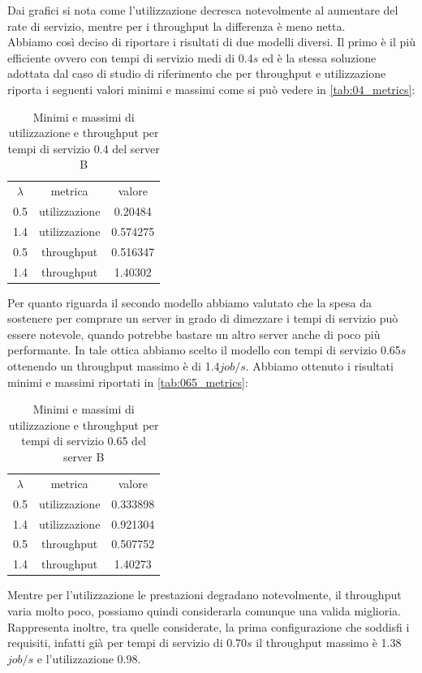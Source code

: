 Dai grafici si nota come l'utilizzazione decresca notevolmente al aumentare del rate di servizio, mentre per i throughput la differenza è meno netta.\\
Abbiamo così deciso di riportare i risultati di due modelli diversi. Il primo è il più efficiente ovvero con tempi di servizio medi di 0.4$s$ ed è la stessa soluzione adottata dal caso di studio di riferimento che per throughput e utilizzazione riporta i seguenti valori minimi e massimi come si può vedere in \autoref{tab:04_metrics}:
\begin{table}
    \centering
    \caption{Minimi e massimi di utilizzazione e throughput per tempi di servizio 0.4 del server B}
    \begin{tabular}{ccc}
         $\lambda$ & metrica & valore\\
        0.5 & utilizzazione & 0.20484\\
        1.4 & utilizzazione & 0.574275\\
        0.5 & throughput & 0.516347\\
        1.4 & throughput & 1.40302
    \end{tabular}
    \label{tab:04_metrics}
\end{table}
 Per quanto riguarda il secondo modello abbiamo valutato che la spesa da sostenere per comprare un server in grado di dimezzare i tempi di servizio
può essere notevole, quando potrebbe bastare un altro server anche di poco più performante. In tale ottica abbiamo scelto il modello con tempi di servizio 0.65$s$ ottenendo un throughput massimo è di 1.4$job/s$. Abbiamo ottenuto i risultati minimi e massimi riportati in \autoref{tab:065_metrics}:
\begin{table}
    \centering
    \caption{Minimi e massimi di utilizzazione e throughput per tempi di servizio 0.65 del server B}
    \begin{tabular}{ccc}
         $\lambda$ & metrica & valore\\
        0.5 & utilizzazione & 0.333898\\
        1.4 & utilizzazione & 0.921304\\
        0.5 & throughput & 0.507752\\
        1.4 & throughput & 1.40273
    \end{tabular}
    \label{tab:065_metrics}
\end{table}
Mentre per l'utilizzazione le prestazioni degradano notevolmente, il throughput varia molto poco, possiamo quindi considerarla comunque una valida miglioria. Rappresenta inoltre, tra quelle considerate, la prima configurazione che soddisfi i requisiti, infatti già per tempi di servizio di 0.70$s$ il throughput massimo è 1.38$job/s$ e l'utilizzazione 0.98.
